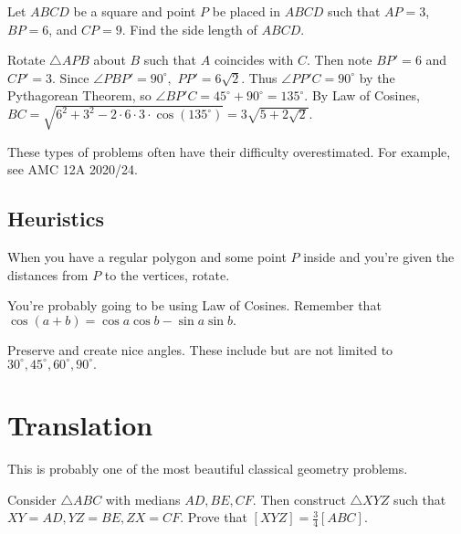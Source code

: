 \documentclass[mast]{lucky}
\begin{document}
\begin{exam}
Let $ABCD$ be a square and point $P$ be placed in $ABCD$ such that $AP=3$, $BP=6$, and $CP=9$. Find the side length of $ABCD.$
\end{exam}

\begin{sol}
Rotate $\triangle APB$ about $B$ such that $A$ coincides with $C.$ Then note $BP'=6$ and $CP'=3.$ Since $\angle PBP'=90^{\circ},$ $PP'=6\sqrt{2}.$ Thus $\angle PP'C=90^{\circ}$ by the Pythagorean Theorem, so $\angle BP'C=45^{\circ}+90^{\circ}=135^{\circ}.$ By Law of Cosines, $BC=\sqrt{6^2+3^2-2\cdot 6\cdot 3\cdot \cos(135^{\circ})}=3\sqrt{5+2\sqrt{2}}.$
\end{sol}

These types of problems often have their difficulty overestimated. For example, see AMC 12A 2020/24.

\subsection{Heuristics}
\begin{itemize}
\Item When you have a regular polygon and some point $P$ inside and you're given the distances from $P$ to the vertices, rotate.

\Item You're probably going to be using Law of Cosines. Remember that $\cos(a+b)=\cos a\cos b-\sin a\sin b.$

\Item Preserve and create nice angles. These include but are not limited to $30^{\circ},45^{\circ},60^{\circ},90^{\circ}.$
\end{itemize}

\section{Translation}
This is probably one of the most beautiful classical geometry problems.

\begin{exam}
Consider $\triangle ABC$ with medians $AD,BE,CF.$ Then construct $\triangle XYZ$ such that $XY=AD,YZ=BE,ZX=CF.$ Prove that $[XYZ]=\frac{3}{4}[ABC].$
\end{exam}
\end{document}
